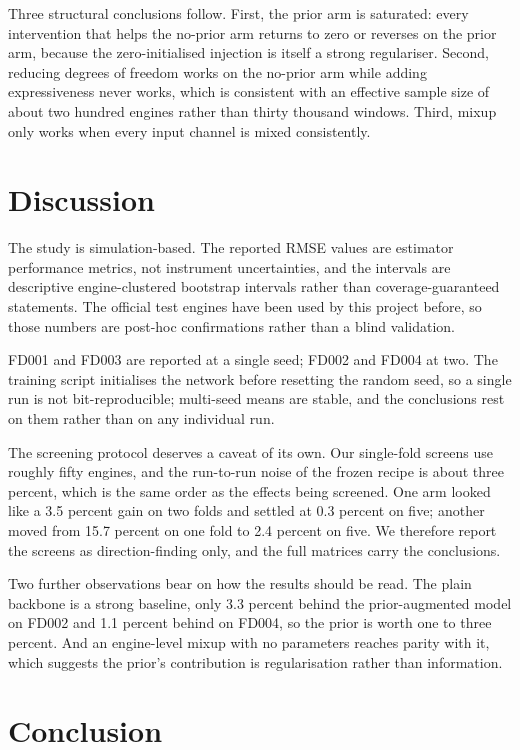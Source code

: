 \documentclass[journal]{IEEEtran}
\begin{document}
Three structural conclusions follow. First, the prior arm is saturated: every intervention that helps the no-prior arm returns to zero or reverses on the prior arm, because the zero-initialised injection is itself a strong regulariser. Second, reducing degrees of freedom works on the no-prior arm while adding expressiveness never works, which is consistent with an effective sample size of about two hundred engines rather than thirty thousand windows. Third, mixup only works when every input channel is mixed consistently.

\section{Discussion}\label{sec:disc}

The study is simulation-based. The reported RMSE values are estimator performance metrics, not instrument uncertainties, and the intervals are descriptive engine-clustered bootstrap intervals rather than coverage-guaranteed statements. The official test engines have been used by this project before, so those numbers are post-hoc confirmations rather than a blind validation.

FD001 and FD003 are reported at a single seed; FD002 and FD004 at two. The training script initialises the network before resetting the random seed, so a single run is not bit-reproducible; multi-seed means are stable, and the conclusions rest on them rather than on any individual run.

The screening protocol deserves a caveat of its own. Our single-fold screens use roughly fifty engines, and the run-to-run noise of the frozen recipe is about three percent, which is the same order as the effects being screened. One arm looked like a 3.5 percent gain on two folds and settled at 0.3 percent on five; another moved from 15.7 percent on one fold to 2.4 percent on five. We therefore report the screens as direction-finding only, and the full matrices carry the conclusions.

Two further observations bear on how the results should be read. The plain backbone is a strong baseline, only 3.3 percent behind the prior-augmented model on FD002 and 1.1 percent behind on FD004, so the prior is worth one to three percent. And an engine-level mixup with no parameters reaches parity with it, which suggests the prior's contribution is regularisation rather than information.

\section{Conclusion}
\end{document}
